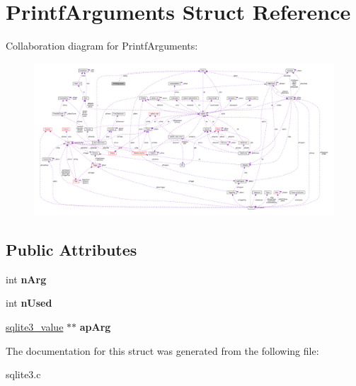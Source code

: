 \hypertarget{structPrintfArguments}{}\section{Printf\+Arguments Struct Reference}
\label{structPrintfArguments}


Collaboration diagram for Printf\+Arguments\+:\nopagebreak
\begin{figure}[H]
\begin{center}
\leavevmode
\includegraphics[width=350pt]{structPrintfArguments__coll__graph}
\end{center}
\end{figure}
\subsection*{Public Attributes}
\begin{DoxyCompactItemize}
\item 
int {\bfseries n\+Arg}\hypertarget{structPrintfArguments_a8f4465ebae2de254882c3253f0f01993}{}\label{structPrintfArguments_a8f4465ebae2de254882c3253f0f01993}

\item 
int {\bfseries n\+Used}\hypertarget{structPrintfArguments_a686ce8f8451154f2ffd7b91cd0908327}{}\label{structPrintfArguments_a686ce8f8451154f2ffd7b91cd0908327}

\item 
\hyperlink{structMem}{sqlite3\+\_\+value} $\ast$$\ast$ {\bfseries ap\+Arg}\hypertarget{structPrintfArguments_a78d20f483184bdb3c0abdeca93f1dd2d}{}\label{structPrintfArguments_a78d20f483184bdb3c0abdeca93f1dd2d}

\end{DoxyCompactItemize}


The documentation for this struct was generated from the following file\+:\begin{DoxyCompactItemize}
\item 
sqlite3.\+c\end{DoxyCompactItemize}

